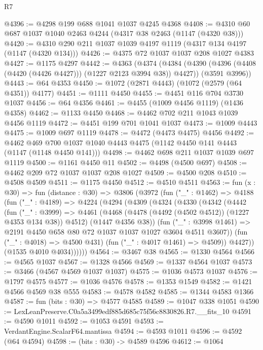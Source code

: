 \begin{lexlean}{R7}
\begin{coremodule}
@4396 := @4298 @199 @688 @1041 @1037 @4245 @4368
@4408 := @4310 @60 @687 @1037 @1040 @2463 @4244 (@4317 @38 @2463 (@1147 (@4320 @38)))
@4420 := @4310 @290 @211 @1037 @1039 @4197 @1119 (@4317 @134 @4197 (@1147 (@4320 @134)))
@4426 := @4375 @72 @1037 @1037 @208 @1027 @4383
@4427 := @1175 @4297
@4442 := @4363
    (@4374
      (@4384 (@4390 (@4396 (@4408 (@4420 (@4426 @4427))) (@1227 @2123 @3994 @38)) @4427))
      (@3591 @3996))
@4443 := @64 @4353
@4450 := @1072 (@2871 @4443) (@1072 (@2579 (@64 @4351)) @4177)
@4451 := @1111 @4450
@4455 := @4451 @116 @704 @3730 @1037
@4456 := @64 @4356
@4461 := @4455 (@1009 @4456 @1119) (@1436 @4358)
@4462 := @1133 @4450
@4468 := @4462 @702 @211 @1043 @1039 @4456 @1119
@4472 := @4451 @199 @701 @1041 @1037
@4473 := @1009 @4443
@4475 := @1009 @697 @1119
@4478 := @4472 (@4473 @4475) @4456
@4492 := @4462 @469 @700 @1037 @1040 @4443 @4475 (@1142 @4450 @141 @4443 (@1147 (@1148 @4450 @141)))
@4498 := @4462 @698 @211 @1037 @1039 @697 @1119
@4500 := @1161 @4450 @11
@4502 := @4498 (@4500 @697)
@4508 := @4462 @209 @72 @1037 @1037 @208 @1027
@4509 := @4500 @208
@4510 := @4508 @4509
@4511 := @1175 @4450
@4512 := @4510 @4511
@4563 := fun (x : @30) =>
  fun (distance : @30) =>
  @3806
    (@3972
      (fun ("_" : @1462) =>
      @4188
        (fun ("_" : @4189) =>
        @4224
          (@4294
            (@4309
              (@4324
                (@4330
                  (@4342
                    (@4442
                      (fun ("_" : @3999) =>
                      @4461
                        (@4468 (@4478 (@4492 (@4502 @4512)) (@1227 @4353 @134 @38)) @4512)
                        (@1447 @4356 @38))
                      (fun ("_" : @3998 @1461) =>
                      @2191 @4450 @658 @80 @72 @1037 @1037 @1027 @3604 @4511 @3607))
                    (fun ("_" : @4018) => @4500 @431)
                    (fun ("_" : @4017 @1461) => @4509))
                  @4427))
              (@1535 @4010 @4034))))))
@4564 := @3467 @38
@4565 := @1330 @4564
@4566 := @4565 @1037
@4567 := @1328 @4566
@4569 := @1337 @4564 @1037
@4573 := @3466 (@4567 @4569 @1037 @1037)
@4575 := @1036 @4573 @1037
@4576 := @1797 @4575
@4577 := @1036 @4576
@4578 := @1353 @1549
@4582 := @1421 @4566 @4569 @38 @555
@4583 := @4578 @4582
@4585 := @1344 @4583 @1366
@4587 := fun (bits : @30) => @4577 @4585
@4589 := @1047 @338 @1051
@4590 := LexLeanPreserve.C0a5a3499edf885d685c75f56c8830826.R7.__fits_10
@4591 := @4590 @1011
@4592 := @1053 @4591
@4593 := VerdantEngine.ScalarF64.mantissa
@4594 := @4593 @1011
@4596 := @4592 (@64 @4594)
@4598 := (bits : @30) -> @4589 @4596
@4612 := @1064

\end{coremodule}
\end{lexlean}
